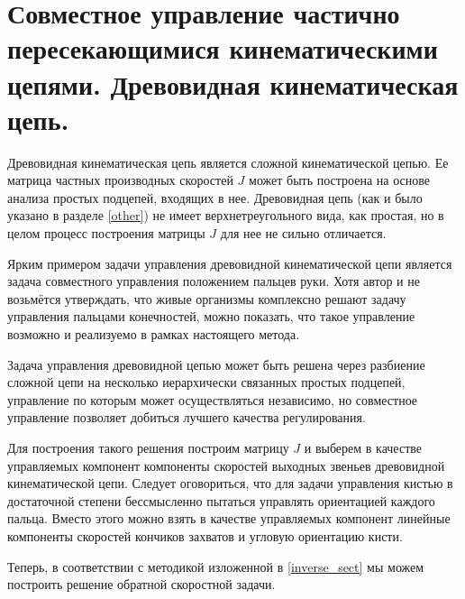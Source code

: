 \section{Совместное управление частично пересекающимися кинематическими цепями. Древовидная кинематическая цепь.}

Древовидная кинематическая цепь является сложной кинематической цепью. Ее матрица частных производных скоростей $J$ может быть построена на основе анализа простых подцепей, входящих в нее. Древовидная цепь (как и было указано в разделе \ref{other}) не имеет верхнетреугольного вида, как простая, но в целом процесс построения матрицы $J$ для нее не сильно отличается.

Ярким примером задачи управления древовидной кинематической цепи является задача совместного управления положением пальцев руки. Хотя автор и не возьмётся утверждать, что живые организмы комплексно решают задачу управления пальцами конечностей, можно показать, что такое управление возможно и реализуемо в рамках настоящего метода.

Задача управления древовидной цепью может быть решена через разбиение сложной цепи на несколько иерархически связанных простых подцепей, управление по которым может осуществляться независимо, но совместное управление позволяет добиться лучшего качества регулирования.

Для построения такого решения построим матрицу $J$ и выберем в качестве управляемых компонент компоненты скоростей выходных звеньев древовидной кинематической цепи. Следует оговориться, что для задачи управления кистью в достаточной степени бессмысленно пытаться управлять ориентацией каждого пальца. Вместо этого можно взять в качестве управляемых компонент линейные компоненты скоростей кончиков захватов и угловую ориентацию кисти. 

Теперь, в соответствии с методикой изложенной в \ref{inverse_sect} мы можем построить решение обратной скоростной задачи.